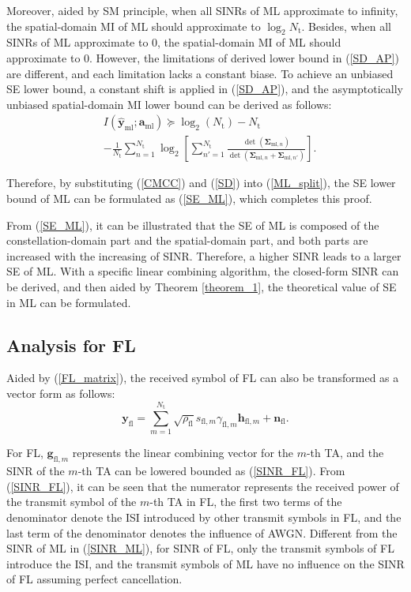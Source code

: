 \documentclass[journal]{IEEEtran}
\begin{document}
\begin{IEEEproof}
Moreover, aided by SM principle, when all SINRs of ML approximate to infinity, the spatial-domain MI of ML should approximate to $\log_2 N_\text{t}$. Besides, when all SINRs of ML approximate to $0$, the spatial-domain MI of ML should approximate to $0$. However, the limitations of derived lower bound in (\ref{SD_AP}) are different, and each limitation lacks a constant biase. To achieve an unbiased SE lower bound, a constant shift is applied in (\ref{SD_AP}), and the asymptotically unbiased spatial-domain MI lower bound can be derived as follows:
\begin{equation}
\begin{split}
&I(\hat{\mathbf{y}}_{\text{ml}};\mathbf{a}_\text{ml}) \succeq \log_2(N_\text{t}) - N_\text{t} \\
&- \frac{1}{N_\text{t}} \sum_{n = 1}^{N_\text{t}} \log_2 \left[\sum_{n'=1}^{N_\text{t}} \frac{\det(\mathbf{\Sigma}_{\text{ml},n})} {\det(\mathbf{\Sigma}_{\text{ml},n}+\mathbf{\Sigma}_{\text{ml},n'})} \right].
\end{split}
\label{SD}
\end{equation}

Therefore, by substituting (\ref{CMCC}) and (\ref{SD}) into (\ref{ML_split}), the SE lower bound of ML can be formulated as (\ref{SE_ML}), which completes this proof.
\end{IEEEproof}

From (\ref{SE_ML}), it can be illustrated that the SE of ML is composed of the constellation-domain part and the spatial-domain part, and both parts are increased with the increasing of SINR. Therefore, a higher SINR leads to a larger SE of ML. With a specific linear combining algorithm, the closed-form SINR can be derived, and then aided by Theorem \ref{theorem_1}, the theoretical value of SE in ML can be formulated.

\subsection{Analysis for FL}

Aided by (\ref{FL_matrix}), the received symbol of FL can also be transformed as a vector form as follows:
\begin{equation}
\mathbf{y}_\text{fl} = \sum_{m=1}^{N_\text{t}} \sqrt{\rho_\text{fl}} s_{\text{fl},m} \gamma_{\text{fl},m} \mathbf{h}_{\text{fl},m} + \mathbf{n}_\text{fl}.
\label{FL_vector}
\end{equation}

For FL, $\mathbf{g}_{\text{fl},m}$ represents the linear combining vector for the $m$-th TA, and the SINR of the $m$-th TA can be lowered bounded as (\ref{SINR_FL}). From (\ref{SINR_FL}), it can be seen that the numerator represents the received power of the transmit symbol of the $m$-th TA in FL, the first two terms of the denominator denote the ISI introduced by other transmit symbols in FL, and the last term of the denominator denotes the influence of AWGN. Different from the SINR of ML in (\ref{SINR_ML}), for SINR of FL, only the transmit symbols of FL introduce the ISI, and the transmit symbols of ML have no influence on the SINR of FL assuming perfect cancellation.
\end{document}
